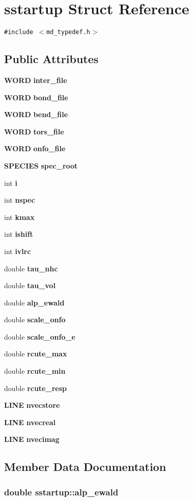 \section{sstartup Struct Reference}
\label{structsstartup}
{\tt \#include $<$md\_\-typedef.h$>$}

\subsection*{Public Attributes}
\begin{CompactItemize}
\item 
{\bf WORD} {\bf inter\_\-file}
\item 
{\bf WORD} {\bf bond\_\-file}
\item 
{\bf WORD} {\bf bend\_\-file}
\item 
{\bf WORD} {\bf tors\_\-file}
\item 
{\bf WORD} {\bf onfo\_\-file}
\item 
{\bf SPECIES} {\bf spec\_\-root}
\item 
int {\bf i}
\item 
int {\bf nspec}
\item 
int {\bf kmax}
\item 
int {\bf ishift}
\item 
int {\bf ivlrc}
\item 
double {\bf tau\_\-nhc}
\item 
double {\bf tau\_\-vol}
\item 
double {\bf alp\_\-ewald}
\item 
double {\bf scale\_\-onfo}
\item 
double {\bf scale\_\-onfo\_\-e}
\item 
double {\bf rcute\_\-max}
\item 
double {\bf rcute\_\-min}
\item 
double {\bf rcute\_\-resp}
\item 
{\bf LINE} {\bf nvecstore}
\item 
{\bf LINE} {\bf nvecreal}
\item 
{\bf LINE} {\bf nvecimag}
\end{CompactItemize}


\subsection{Member Data Documentation}
\subsubsection{\setlength{\rightskip}{0pt plus 5cm}double {\bf sstartup::alp\_\-ewald}}\label{structsstartup_6bed6f4e6ae1f01e880ecb954b2682f9}


